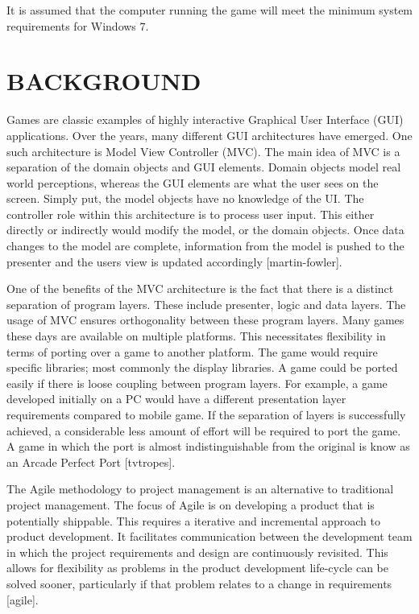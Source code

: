 \documentclass[10pt,twocolumn]{witseiepaper}
\begin{document}
It is assumed that the computer running the game will meet the minimum system requirements for Windows 7. 

%
\section{BACKGROUND} %
Games are classic examples of highly interactive Graphical User Interface (GUI) applications. Over the years, many different GUI architectures have emerged. One such architecture is Model View Controller (MVC). The main idea of MVC is a separation of the domain objects and GUI elements. Domain objects model real world perceptions, whereas the GUI elements are what the user sees on the screen. Simply put, the model objects have no knowledge of the UI. The controller role within this architecture is to process user input. This either directly or indirectly would modify the model, or the domain objects. Once data changes to the model are complete, information from the model is pushed to the presenter and the users view is updated accordingly [martin-fowler].

One of the benefits of the MVC architecture is the fact that there is a distinct separation of program layers. These include presenter, logic and data layers. The usage of MVC ensures orthogonality between these program layers. Many games these days are available on multiple platforms. This necessitates flexibility in terms of porting over a game to another platform. The game would require specific libraries; most commonly the display libraries. A game could be ported easily if there is loose coupling between program layers. For example, a game developed initially on a PC would have a different presentation layer requirements compared to mobile game. If the separation of layers is successfully achieved, a considerable less amount of effort will be required to port the game. A game in which the port is almost indistinguishable from the original is know as an Arcade Perfect Port [tvtropes].

The Agile methodology to project management is an alternative to traditional project management. The focus of Agile is on developing a product that is potentially shippable. This requires a iterative and incremental approach to product development. It facilitates communication between the development team in which the project requirements and design are continuously revisited. This allows for flexibility as problems in the product development life-cycle can be solved sooner, particularly if that problem relates to a change in requirements [agile].
\end{document}
